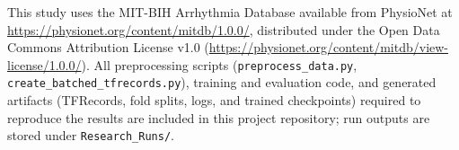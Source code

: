 This study uses the MIT-BIH Arrhythmia Database available from PhysioNet at \url{https://physionet.org/content/mitdb/1.0.0/}, distributed under the Open Data Commons Attribution License v1.0 (\url{https://physionet.org/content/mitdb/view-license/1.0.0/}). All preprocessing scripts (\texttt{preprocess\_data.py}, \texttt{create\_batched\_tfrecords.py}), training and evaluation code, and generated artifacts (TFRecords, fold splits, logs, and trained checkpoints) required to reproduce the results are included in this project repository; run outputs are stored under \texttt{Research\_Runs/}.
